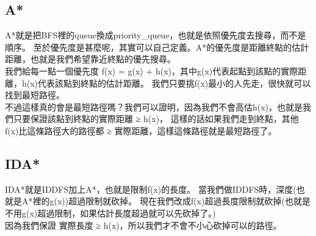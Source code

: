 \documentclass{article}
\begin{document}
\subsection{A*}
A*就是把BFS裡的queue換成priority_queue，也就是依照優先度去搜尋，而不是順序。
至於優先度是甚麼呢，其實可以自己定義。A*的優先度是距離終點的估計距離，也就是我們希望靠近終點的優先搜尋。\\
我們給每一點一個優先度 f(x) = g(x) + h(x)，其中g(x)代表起點到該點的實際距離，h(x)代表該點到終點的估計距離。
我們只要挑f(x)最小的人先走，很快就可以找到最短路徑。\\
不過這樣真的會是最短路徑嗎？我們可以證明，因為我們不會高估h(x)，也就是我們只要保證該點到終點的實際距離 ≥ h(x)，
這樣的話如果我們走到終點，其他 f(x)比這條路徑大的路徑都 ≥ 實際距離，這樣這條路徑就是最短路徑了。

\subsection{IDA*}
IDA*就是IDDFS加上A*，也就是限制f(x)的長度。
當我們做IDDFS時，深度(也就是A*裡的g(x))超過限制就砍掉。
現在我們改成f(x)超過長度限制就砍掉(也就是不用g(x)超過限制，如果估計長度超過就可以先砍掉了。)\\
因為我們保證 實際長度 ≥ h(x)，所以我們才不會不小心砍掉可以的路徑。



\end{document}
